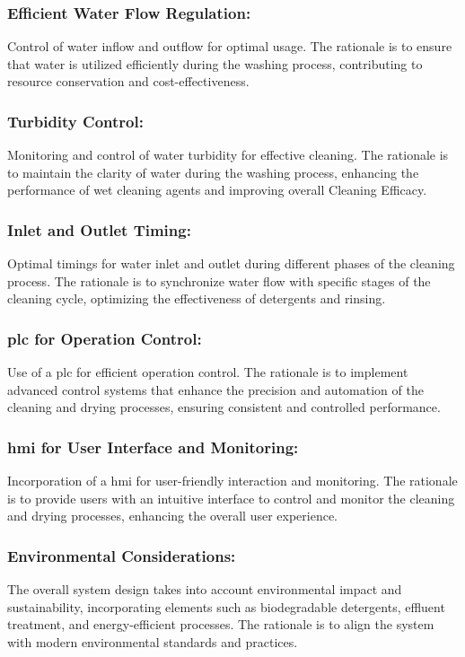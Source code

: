 \documentclass[12pt]{article} %
\begin{document}
 \subsubsection{Efficient Water Flow Regulation:} Control of water inflow and outflow for optimal usage. The rationale is to ensure that water is utilized efficiently during the washing process, contributing to resource conservation and cost-effectiveness.
 
 \subsubsection{Turbidity Control:} Monitoring and control of water turbidity for effective cleaning. The rationale is to maintain the clarity of water during the washing process, enhancing the performance of \gls{wet cleaning agent}s and improving overall \gls{Cleaning Efficacy}.
 
 \subsubsection{Inlet and Outlet Timing:} Optimal timings for water inlet and outlet during different phases of the cleaning process. The rationale is to synchronize water flow with specific stages of the cleaning cycle, optimizing the effectiveness of detergents and rinsing.
 
 \subsubsection{\acrshort{plc} for Operation Control:} Use of a \acrlong{plc} for efficient operation control. The rationale is to implement advanced control systems that enhance the precision and automation of the cleaning and drying processes, ensuring consistent and controlled performance.
 
 \subsubsection{\acrshort{hmi} for User Interface and Monitoring:} Incorporation of a \acrlong{hmi} for user-friendly interaction and monitoring. The rationale is to provide users with an intuitive interface to control and monitor the cleaning and drying processes, enhancing the overall user experience.
 
 \subsubsection{Environmental Considerations:} The overall system design takes into account environmental impact and sustainability, incorporating elements such as biodegradable detergents, \gls{effluent treatment}, and energy-efficient processes. The rationale is to align the system with modern environmental standards and practices.
 
\end{document}
